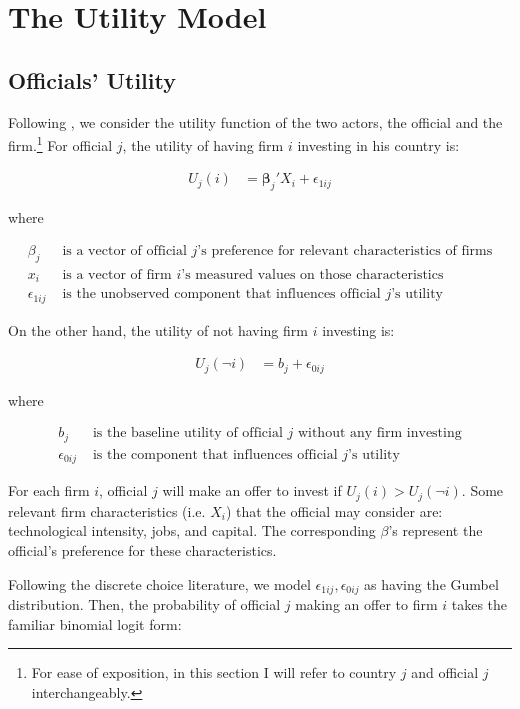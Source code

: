 \section{The Utility Model}

\subsection{Officials' Utility}

Following \citet{Logan1998}, we consider the utility function of the two actors, the official and the firm.\footnote{For ease of exposition, in this section I will refer to country $j$ and official $j$ interchangeably.} For official $j$, the utility of having firm $i$ investing in his country is:

\begin{align}
U_j(i) &= \bm{\beta}_j' X_i + \epsilon_{1ij}
\end{align}

where

\begin{align*}
\beta_j &\text{ is a vector of official $j$'s preference for relevant characteristics of firms} \\
x_i &\text{ is a vector of firm $i$'s measured values on those characteristics} \\
\epsilon_{1ij} &\text{ is the unobserved component that influences official $j$'s utility}
\end{align*}

On the other hand, the utility of not having firm $i$ investing is:

\begin{align}
U_j(\neg i) &= b_j + \epsilon_{0ij}
\end{align}

where

\begin{align*}
b_j &\text{ is the baseline utility of official $j$ without any firm investing} \\
\epsilon_{0ij} &\text{ is the component that influences official $j$'s utility}
\end{align*}

For each firm $i$, official $j$ will make an offer to invest if $U_j(i) > U_j(\neg i)$. Some relevant firm characteristics (i.e. $X_i$) that the official may consider are: technological intensity, jobs, and capital. The corresponding $\beta$'s represent the official's preference for these characteristics.

Following the discrete choice literature, we model $\epsilon_{1ij}, \epsilon_{0ij}$ as having the Gumbel distribution. Then, the probability of official $j$ making an offer to firm $i$ takes the familiar binomial logit form:

